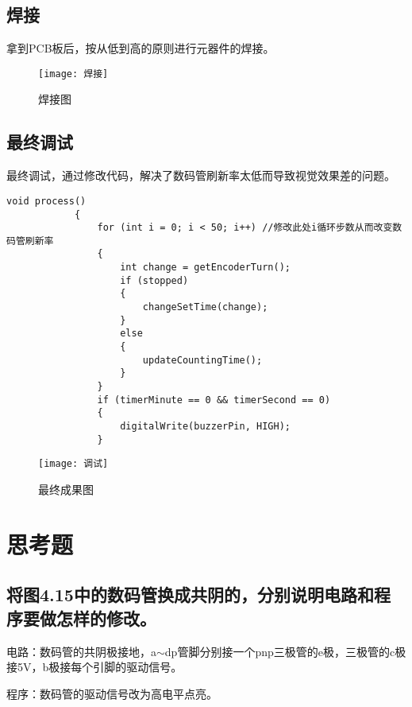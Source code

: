 \documentclass{../source/Experiment}
\begin{document}
            \subsection{焊接}
            拿到PCB板后，按从低到高的原则进行元器件的焊接。
            \begin{figure}[H]
                \centering
                \texttt{[image: 焊接]}
                \caption{焊接图}
            \end{figure}
            \subsection{最终调试}
            最终调试，通过修改代码，解决了数码管刷新率太低而导致视觉效果差的问题。
            \begin{lstlisting}[name = 修改数码管刷新率]
            void process()
            {
                for (int i = 0; i < 50; i++) //修改此处i循环步数从而改变数码管刷新率
                {
                    int change = getEncoderTurn();
                    if (stopped)
                    {
                        changeSetTime(change);
                    }
                    else
                    {
                        updateCountingTime();
                    }
                }
                if (timerMinute == 0 && timerSecond == 0)
                {
                    digitalWrite(buzzerPin, HIGH);
                }        
            \end{lstlisting}

            \begin{figure}[H]
                \centering
                \texttt{[image: 调试]}
                \caption{最终成果图}
            \end{figure}
            
    \section{思考题}

    \subsection{将图4.15中的数码管换成共阴的，分别说明电路和程序要做怎样的修改。}

    电路：数码管的共阴极接地，a$\sim$dp管脚分别接一个pnp三极管的e极，三极管的c极接5V，b极接每个引脚的驱动信号。

    程序：数码管的驱动信号改为高电平点亮。
\end{document}
